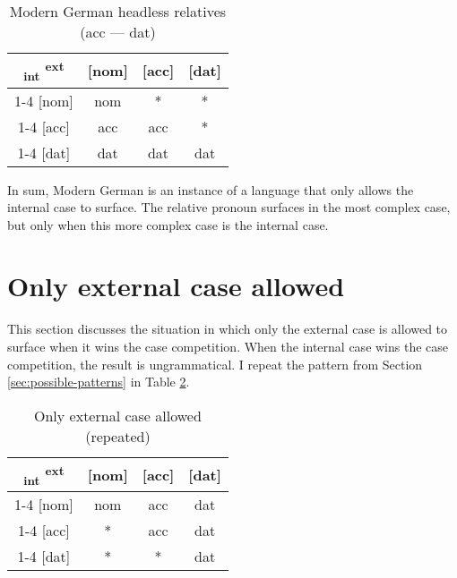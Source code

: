 \begin{table}[H]
  \center
  \caption{Modern German headless relatives (\ac{acc} --- \ac{dat})}
  \begin{tabular}{c|c|c|c}
    \toprule
    \textsubscript{\ac{int}} \textsuperscript{\ac{ext}}
           & [\ac{nom}]
           & [\ac{acc}]
           & [\ac{dat}]
           \\ \cmidrule{1-4}
       [\ac{nom}]
           & \ac{nom}
           & *
           & *
           \\ \cmidrule{1-4}
       [\ac{acc}]
           & \ac{acc}
           & \ac{acc}
           & \cellcolor{DG}*
           \\ \cmidrule{1-4}
       [\ac{dat}]
           & \ac{dat}
           & \cellcolor{LG}\ac{dat}
           & \ac{dat}
           \\
     \bottomrule
  \end{tabular}
    \label{tbl:case-competition-mg-acc-dat}
\end{table}

In sum, Modern German is an instance of a language that only allows the internal case to surface. The relative pronoun surfaces in the most complex case, but only when this more complex case is the internal case.


\section{Only external case allowed}\label{sec:pattern-iii}

This section discusses the situation in which only the external case is allowed to surface when it wins the case competition. When the internal case wins the case competition, the result is ungrammatical. I repeat the pattern from Section \ref{sec:possible-patterns} in Table \ref{tbl:case-competition-only-ext-repeated}.

\begin{table}[H]
  \center
  \caption{Only external case allowed (repeated)}
  \begin{tabular}{c|c|c|c}
    \toprule
    \textsubscript{\ac{int}} \textsuperscript{\ac{ext}}
           & [\ac{nom}]
           & [\ac{acc}]
           & [\ac{dat}]
           \\ \cmidrule{1-4}
       [\ac{nom}]
           & \ac{nom}
           & \ac{acc}
           & \ac{dat}
           \\ \cmidrule{1-4}
       [\ac{acc}]
           & *
           & \ac{acc}
           & \ac{dat}
           \\ \cmidrule{1-4}
       [\ac{dat}]
           & *
           & *
           & \ac{dat}
           \\
     \bottomrule
  \end{tabular}
    \label{tbl:case-competition-only-ext-repeated}
\end{table}

